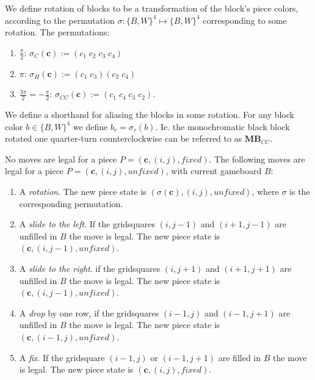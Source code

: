 \begin{description}[style=unboxed, leftmargin=0cm,labelsep=1em]
    \item[Rotating pieces] We define rotation of blocks to be a transformation of the block's piece colors, according to the permutation $\sigma: \{B,W\}^4 \mapsto \{B,W\}^4$ corresponding to some rotation. The permutations:

    \begin{enumerate}
        \item $\frac{\pi}{2}$: $\sigma_{C}(\mathbf{c}) := (c_1\;c_2\;c_3\;c_4)$
        \item $\pi$: $\sigma_{H}(\mathbf{c}) := (c_1\;c_3)(c_2\;c_4)$
        \item $\frac{3 \pi}{2} = -\frac{\pi}{2}$: $\sigma_{CC}(\mathbf{c}) := (c_1\;c_4\;c_3\;c_2)$.
    \end{enumerate}

    We define a shorthand for aliasing the blocks in some rotation. For any block color $b \in \{B, W\}^4$ we define $b_{r} = \sigma_{r}(b)$. Ie. the monochromatic black block rotated one quarter-turn counterclockwise can be referred to as $\mathbf{MB}_{CC}$.

    \item[Playing the game] No moves are legal for a piece $P = (\mathbf{c}, (i,j), fixed)$. The following moves are legal for a piece $P = (\mathbf{c}, (i,j), unfixed)$, with current gameboard $B$:

    \begin{enumerate}
        \item A \emph{rotation}. The new piece state is $(\sigma(\mathbf{c}), (i,j), unfixed)$, where $\sigma$ is the corresponding permutation.
        \item A \emph{slide to the left}. If the gridsquares $(i,j-1)$ and $(i+1, j-1)$ are unfilled in $B$ the move is legal. The new piece state is $(\mathbf{c}, (i, j-1), unfixed)$.
        \item A \emph{slide to the right}. if the gridsquares $(i,j+1)$ and $(i+1, j+1)$ are unfilled in $B$ the move is legal. The new piece state is $(\mathbf{c}, (i, j-1), unfixed)$.
        \item A \emph{drop} by one row, if the gridsquares $(i-1, j)$ and $(i-1, j+1)$ are unfilled in $B$ the move is legal. The new piece state is $(\mathbf{c}, (i-1, j), unfixed)$.
        \item A \emph{fix}. If the gridsquare $(i-1, j)$ or $(i-1, j+1)$ are filled in $B$ the move is legal. The new piece state is $(\mathbf{c}, (i, j), fixed)$.
    \end{enumerate}
\end{description}
